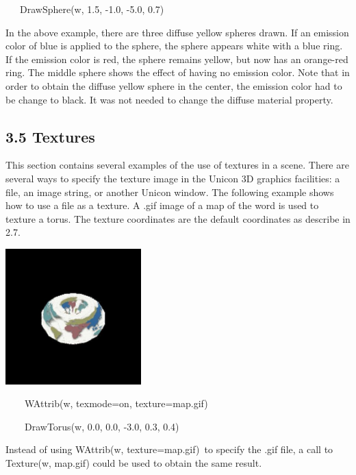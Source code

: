 \documentclass[letterpaper]{article}
\begin{document}
{{\sffamily
\ \ \ DrawSphere(w, 1.5, -1.0, -5.0, 0.7) }


\bigskip

In the above example, there are three diffuse yellow spheres drawn. If
an emission color of blue is applied to the sphere, the sphere appears
white with a blue ring. If the emission color is red, the sphere
remains yellow, but now has an orange-red ring. The middle sphere
shows the effect of having no emission color. Note that in order to
obtain the diffuse yellow sphere in the center, the emission color had
to be change to black. It was not needed to change the diffuse
material property.


\subsection[3.5 Textures]{3.5 Textures}

This section contains several examples of the use of textures in a
scene. There are several ways to specify the texture image in the
Unicon 3D graphics facilities: a file, an image string, or another
Unicon window. The following example shows how to use a file as a
texture. A .gif image of a map of the word is used to texture a
torus. The texture coordinates are the default coordinates as describe
in 2.7.


\bigskip

{\centering  \includegraphics[width=2.0583in,height=2.0583in]{utr9/utr9-img026.jpg} \par}

\bigskip

{\ttfamily
\textsf{\ \ \ \ }\textsf{WAttrib(w, {\textquotedbl}texmode=on{\textquotedbl},
{\textquotedbl}texture=map.gif{\textquotedbl})}}

{\sffamily
\ \ \ \ DrawTorus(w, 0.0, 0.0, -3.0, 0.3, 0.4) }


\bigskip

{
Instead of using \textsf{WAttrib(w, {\textquotedbl}texture=map.gif{\textquotedbl})}\texttt{ }to specify the .gif file, a
call to \textsf{Texture(w, {\textquotedbl}map.gif{\textquotedbl})} could be used to obtain the same result.}


}
\end{document}
